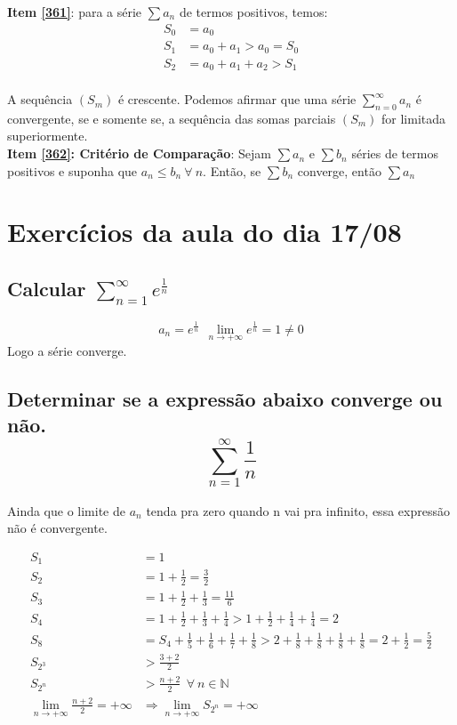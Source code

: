 \documentclass[12pt,openany]{book}
\begin{document}
\textbf{Item \ref{361}}: para a série $\sum a_n$ de termos positivos, temos:
\begin{align*}
S_0 &= a_0 \\
S_1 &= a_0 + a_1 > a_0 = S_0 \\
S_2 &= a_0 + a_1 + a_2 > S_1 \\
\end{align*}

A sequência $(S_m)$ é crescente. Podemos afirmar que uma série $\displaystyle{\sum_{n=0}^{\infty} a_n}$ é convergente, se e somente se, a sequência das somas parciais $(S_m)$ for limitada superiormente. \\

\textbf{Item \ref{362}: Critério de Comparação}: Sejam $\sum a_n$ e $\sum b_n$ séries de termos positivos e suponha que $a_n \leq b_n \ \forall \ n$. Então, se $\sum b_n$ converge, então $\sum a_n$

\section{Exercícios da aula do dia 17/08}
\label{sec:s37}

\subsection{Calcular $\displaystyle{\sum_{n=1}^{\infty} e^{\frac{1}{n}}} $}
$$ a_n = e^{\frac{1}{n}} \ \ \lim_{n \rightarrow +\infty} e^{\frac{1}{n}} = 1 \neq 0$$ Logo a série converge.

\subsection{Determinar se a expressão abaixo converge ou não. $$\sum_{n=1}^{\infty} \frac{1}{n}$$}

Ainda que o limite de $a_n$ tenda pra zero quando n vai pra infinito, essa expressão não é convergente.

\begin{align*}
S_1 &= 1 \\
S_2 &= 1 + \frac{1}{2} = \frac{3}{2} \\
S_3 &= 1 + \frac{1}{2} + \frac{1}{3} = \frac{11}{6} \\
S_4 &= 1 + \frac{1}{2} + \frac{1}{3} + \frac{1}{4} > 1 + \frac{1}{2} + \frac{1}{4} + \frac{1}{4} = 2 \\
S_8 &= S_4 + \frac{1}{5} + \frac{1}{6} + \frac{1}{7} + \frac{1}{8} > 2 + \frac{1}{8} + \frac{1}{8} + \frac{1}{8} + \frac{1}{8} = 2 + \frac{1}{2} = \frac{5}{2} \\
S_{2^3} &> \frac{3 + 2}{2} \\
S_{2^n} &> \frac{n + 2}{2} \ \ \forall \ n \in \mathds{N} \\
\lim_{n \rightarrow +\infty} \frac{n+2}{2} = +\infty &\Rightarrow \lim_{n \rightarrow +\infty} S_{2^n} = +\infty \\
\end{align*}
\end{document}

